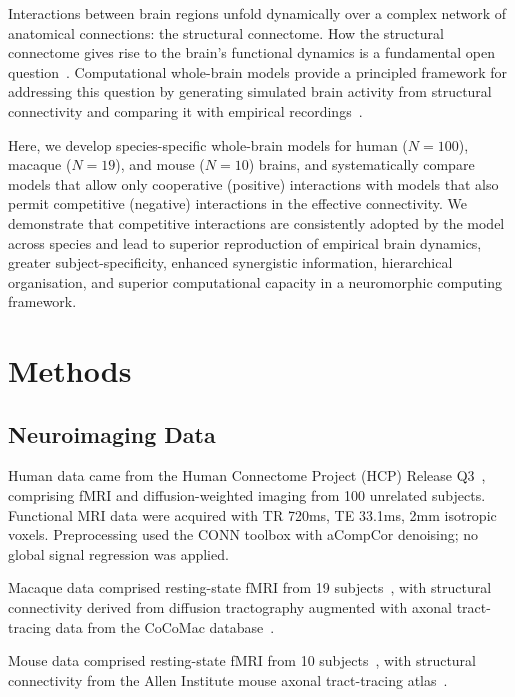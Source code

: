 \documentclass[11pt]{article}
\begin{document}
Interactions between brain regions unfold dynamically over a complex network of anatomical connections: the structural connectome. How the structural connectome gives rise to the brain's functional dynamics is a fundamental open question~\citep{honey2009predicting,suarez2024structure,avena2018physics,seguin2023brain,zamora2020linking}. Computational whole-brain models provide a principled framework for addressing this question by generating simulated brain activity from structural connectivity and comparing it with empirical recordings~\citep{breakspear2017dynamic,deco2014great,sanz2023brain}.

Here, we develop species-specific whole-brain models for human ($N=100$), macaque ($N=19$), and mouse ($N=10$) brains, and systematically compare models that allow only cooperative (positive) interactions with models that also permit competitive (negative) interactions in the effective connectivity. We demonstrate that competitive interactions are consistently adopted by the model across species and lead to superior reproduction of empirical brain dynamics, greater subject-specificity, enhanced synergistic information, hierarchical organisation, and superior computational capacity in a neuromorphic computing framework.

\section{Methods}

\subsection{Neuroimaging Data}

Human data came from the Human Connectome Project (HCP) Release Q3~\citep{vanessen2013human}, comprising fMRI and diffusion-weighted imaging from 100 unrelated subjects. Functional MRI data were acquired with TR 720ms, TE 33.1ms, 2mm isotropic voxels. Preprocessing used the CONN toolbox with aCompCor denoising; no global signal regression was applied.

Macaque data comprised resting-state fMRI from 19 subjects~\citep{grayson2016macaque}, with structural connectivity derived from diffusion tractography augmented with axonal tract-tracing data from the CoCoMac database~\citep{stephan2001cocomac}.

Mouse data comprised resting-state fMRI from 10 subjects~\citep{grandjean2020mouse}, with structural connectivity from the Allen Institute mouse axonal tract-tracing atlas~\citep{oh2014mesoscale}.
\end{document}
